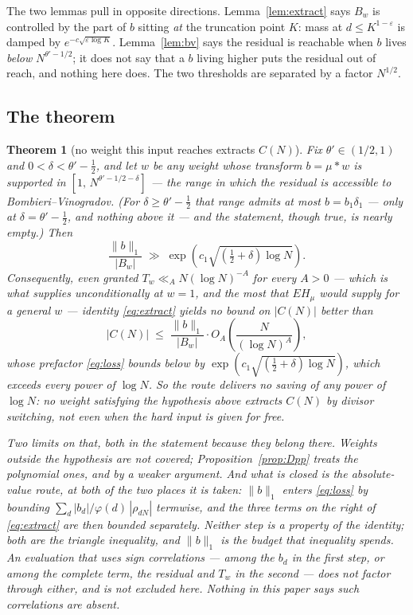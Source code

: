 \documentclass[11pt,a4paper]{article}
\theoremstyle{plain}
\newtheorem{theorem}{Theorem}
\theoremstyle{definition}
\theoremstyle{remark}
\begin{document}
The two lemmas pull in opposite directions. Lemma~\ref{lem:extract}
says $B_w$ is controlled by the part of $b$ sitting \emph{at} the
truncation point $K$: mass at $d\le K^{1-\varepsilon}$ is damped by
$e^{-c\sqrt{\varepsilon\log K}}$. Lemma~\ref{lem:bv} says the residual is
reachable when $b$ lives \emph{below} $N^{\theta'-1/2}$; it does not
say that a $b$ living higher puts the residual out of reach, and
nothing here does. The two thresholds are separated by a factor
$N^{1/2}$.

\subsection{The theorem}

\begin{theorem}[no weight this input reaches extracts
$C(N)$]\label{thm:D}
Fix $\theta'\in(1/2,1)$ and $0<\delta<\theta'-\tfrac12$, and let $w$
be any weight
whose transform $b=\mu*w$ is supported in
$[1,\,N^{\theta'-1/2-\delta}]$ --- the range in which the residual is
accessible to Bombieri--Vinogradov. (For $\delta\ge\theta'-\tfrac12$
that range admits at most $b=b_1\delta_1$ --- only at
$\delta=\theta'-\tfrac12$, and nothing above it --- and the statement, though true,
is nearly empty.) Then
\begin{equation}\label{eq:loss}
  \frac{\|b\|_1}{|B_w|}\;\gg\;
   \exp\!\left(c_1\sqrt{(\tfrac12+\delta)\log N}\right).
\end{equation}
Consequently, \emph{even granted} $T_w\ll_A N(\log N)^{-A}$ for every
$A>0$ --- which is what \cite[Theorem on the flat branch]{P1} supplies unconditionally at
$w=1$, and the most that $EH_\mu$ would supply for a general $w$ ---
identity \eqref{eq:extract} yields no bound on $|C(N)|$ better than
\[
  |C(N)|\;\le\;\frac{\|b\|_1}{|B_w|}
     \cdot O_A\!\left(\frac{N}{(\log N)^{A}}\right),
\]
whose prefactor \eqref{eq:loss} bounds below by
$\exp(c_1\sqrt{(\frac12+\delta)\log N})$, which exceeds every power of
$\log N$. So the route delivers no saving of any power of
$\log N$: no weight satisfying the hypothesis above extracts
$C(N)$ by divisor switching, not even when the hard input is given
for free.

Two limits on that, both in the statement because they belong there.
Weights outside the hypothesis are not covered; Proposition~\ref{prop:Dpp}
treats the polynomial ones, and by a weaker argument. And what is
closed is the absolute-value route, at both of the two places it is
taken: $\|b\|_1$ enters \eqref{eq:loss} by bounding
$\sum_d|b_d|/\varphi(d)\,|\rho_{dN}|$ termwise, and the three terms on
the right of \eqref{eq:extract} are then bounded separately. Neither
step is a property of the identity; both are the triangle inequality,
and $\|b\|_1$ is the budget that inequality spends. An evaluation that
uses sign correlations --- among the $b_d$ in the first step, or among
the complete term, the residual and $T_w$ in the second --- does not
factor through either, and is not excluded here. Nothing in this paper
says such correlations are absent.
\end{theorem}
\end{document}
